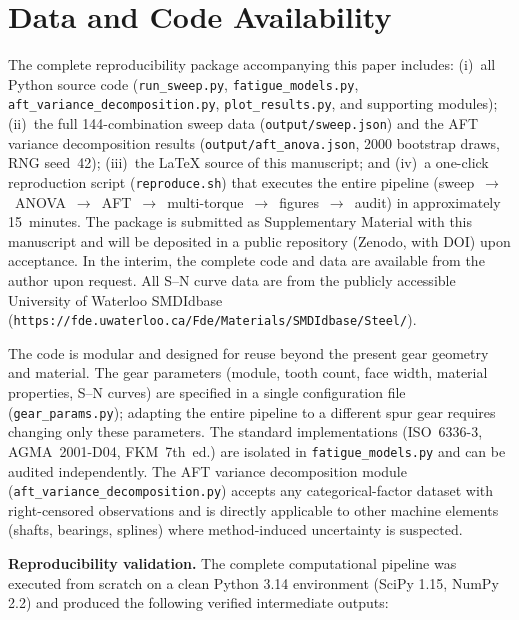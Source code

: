 \documentclass[twocolumn,12pt,a4paper]{article}
\begin{document}
\section*{Data and Code Availability}

The complete reproducibility package accompanying this paper includes:
(i)~all Python source code (\texttt{run\_sweep.py},
\texttt{fatigue\_models.py}, \texttt{aft\_variance\_decomposition.py},
\texttt{plot\_results.py}, and supporting modules);
(ii)~the full 144-combination sweep data
(\texttt{output/sweep.json}) and the AFT variance decomposition
results (\texttt{output/aft\allowbreak\_anova\allowbreak.json},
2000 bootstrap draws, RNG seed~42);
(iii)~the LaTeX source of this manuscript; and
(iv)~a one-click reproduction script (\texttt{reproduce.sh}) that
executes the entire pipeline (sweep~$\rightarrow$~ANOVA~$\rightarrow$~AFT~$\rightarrow$~multi-torque~$\rightarrow$~figures~$\rightarrow$~audit)
in approximately 15~minutes.
The package is submitted as Supplementary Material with this
manuscript and will be deposited in a public repository (Zenodo,
with DOI) upon acceptance. In the interim, the complete code and
data are available from the author upon request. All S--N curve data are from the
publicly accessible University of Waterloo SMDIdbase
(\texttt{https://fde.uwaterloo.ca/\allowbreak Fde/Materials/\allowbreak SMDIdbase/Steel/}).

The code is modular and designed for reuse beyond the present gear
geometry and material. The gear parameters (module, tooth count, face
width, material properties, S--N curves) are specified in a single
configuration file (\texttt{gear\_params.py}); adapting the entire
pipeline to a different spur gear requires changing only these
parameters. The standard implementations (ISO~6336-3, AGMA~2001-D04,
FKM~7th~ed.) are isolated in \texttt{fatigue\_models.py} and can be
audited independently. The AFT variance decomposition module
(\texttt{aft\_variance\_decomposition.py}) accepts any
categorical-factor dataset with right-censored observations and is
directly applicable to other machine elements (shafts, bearings,
splines) where method-induced uncertainty is suspected.

\textbf{Reproducibility validation.} The complete computational
pipeline was executed from scratch on a clean Python 3.14 environment
(SciPy 1.15, NumPy 2.2) and produced the following verified
intermediate outputs:
\end{document}
